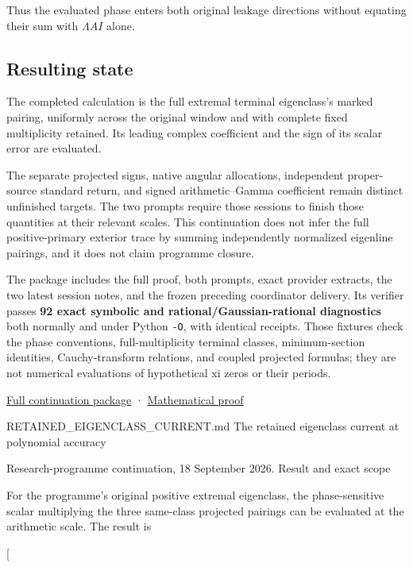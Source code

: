 Thus the evaluated phase enters both original leakage directions without equating their sum with \(\Lambda AI\) alone.

\subsection{Resulting state}\label{resulting-state}

The completed calculation is the full extremal terminal eigenclass's marked pairing, uniformly across the original window and with complete fixed multiplicity retained. Its leading complex coefficient and the sign of its scalar error are evaluated.

The separate projected signs, native angular allocations, independent proper-source standard return, and signed arithmetic--Gamma coefficient remain distinct unfinished targets. The two prompts require those sessions to finish those quantities at their relevant scales. This continuation does not infer the full positive-primary exterior trace by summing independently normalized eigenline pairings, and it does not claim programme closure.

The package includes the full proof, both prompts, exact provider extracts, the two latest session notes, and the frozen preceding coordinator delivery. Its verifier passes \textbf{92 exact symbolic and rational/Gaussian-rational diagnostics} both normally and under Python \texttt{-O}, with identical receipts. Those fixtures check the phase conventions, full-multiplicity terminal classes, minimum-section identities, Cauchy-transform relations, and coupled projected formulas; they are not numerical evaluations of hypothetical xi zeros or their periods.

\href{sandbox:/mnt/data/Retained_Class_Phase_and_Continuation_Targets_20260918.zip}{Full continuation package} · \href{sandbox:/mnt/data/Retained_Class_Phase_and_Continuation_Targets_20260918/proof/RETAINED_EIGENCLASS_CURRENT.md}{Mathematical proof}

RETAINED\_EIGENCLASS\_CURRENT.md The retained eigenclass current at polynomial accuracy

Research-programme continuation, 18 September 2026. Result and exact scope

For the programme's original positive extremal eigenclass, the phase-sensitive scalar multiplying the three same-class projected pairings can be evaluated at the arithmetic scale. The result is

{[}  \tag{EC1}{]}

